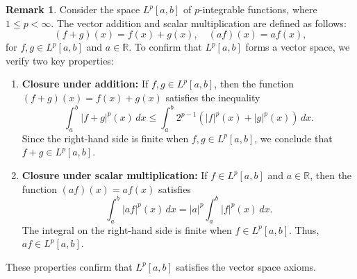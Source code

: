 \documentclass[12pt, reqno]{amsart}
\theoremstyle{definition}
\newtheorem{example}[theorem]{Example}
\newtheorem{remark}[theorem]{Remark}
\numberwithin{equation}{section}
\newcommand{\dR}{{\mathbb R}}
\begin{document}
\begin{comment}
For instance, the sequence $ \left( \frac{1}{n^2} \right) = \left( 1, \frac{1}{4}, \frac{1}{9}, \dots \right) $ belongs to $ \ell^2 $, since the sum

\[
\sum_{n=1}^\infty \left| \frac{1}{n^2} \right|^2 = 1 + \frac{1}{16} + \frac{1}{81} + \dots
\]

converges to a finite value.
\end{example}    

\begin{example} Consider the function $ f(x) = \frac{1}{\sqrt{x}} $ defined on the interval $ [1, 2] $. This function belongs to $ L^2([1, 2]) $, since

\[
\int_1^2 \left| \frac{1}{\sqrt{x}} \right|^^2 \, dx = \int_1^2 \frac{1}{x} \, dx = \ln(2) - \ln(1) = \ln(2)
\]

is finite. Therefore, $ f(x) \in L^2([1, 2]) $.
\end{example}


\begin{example} Consider the function $ f(x) = \frac{1}{\sqrt{x}} $ defined on the interval $ [1, 2] $. This function belongs to $ L^2([1, 2]) $, since

\[
\int_1^2 \left| \frac{1}{\sqrt{x}} \right|^^2 \, dx = \int_1^2 \frac{1}{x} \, dx = \ln(2) - \ln(1) = \ln(2)
\]

is finite. Therefore, $ f(x) \in L^2([1, 2]) $.
\end{example}

\end{comment}
\begin{remark}
Consider the space $L^p[a, b]$ of $p$-integrable functions, where $1 \leq p < \infty$. The vector addition and scalar multiplication are defined as follows:
\[
(f+g)(x) = f(x) + g(x), \quad (af)(x) = a f(x),
\]
for $f, g \in L^p[a, b]$ and $a \in \dR$. To confirm that $L^p[a, b]$ forms a vector space, we verify two key properties:

\begin{enumerate}
    \item \textbf{Closure under addition:} If $f, g \in L^p[a, b]$, then the function $(f+g)(x) = f(x) + g(x)$ satisfies the inequality
    \[
    \int_a^b |f+g|^p(x) \, dx \leq \int_a^b 2^{p-1}(|f|^p(x) + |g|^p(x)) \, dx.
    \]
    Since the right-hand side is finite when $f, g \in L^p[a, b]$, we conclude that $f+g \in L^p[a, b]$.

    \item \textbf{Closure under scalar multiplication:} If $f \in L^p[a, b]$ and $a \in \dR$, then the function $(af)(x) = a f(x)$ satisfies
    \[
    \int_a^b |af|^p(x) \, dx = |a|^p \int_a^b |f|^p(x) \, dx.
    \]
The integral on the right-hand side is finite when $f \in L^p[a, b]$. Thus, $af \in L^p[a, b]$.
\end{enumerate}

These properties confirm that $L^p[a, b]$ satisfies the vector space axioms.
\end{remark}
\end{document}
